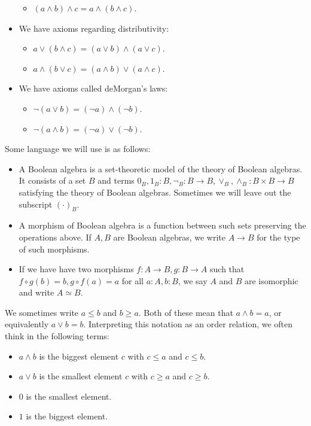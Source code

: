 \begin{definition}
\begin{itemize}
\begin{itemize}
        \item $(a \wedge b) \wedge c = a \wedge (b \wedge c)$. 
      \end{itemize}
    \item We have axioms regarding distributivity:
      \begin{itemize}
        \item $a \vee (b \wedge c) = ( a \vee b) \wedge (a \vee c)$. 
        \item $a \wedge (b \vee c) = (a \wedge b) \vee ( a\wedge c)$. 
      \end{itemize}
    \item We have axioms called deMorgan's laws:
      \begin{itemize}
        \item $\neg (a \vee b ) = (\neg a) \wedge (\neg b)$. 
        \item $\neg (a \wedge b) = (\neg a) \vee (\neg b)$. 
      \end{itemize}
  \end{itemize}
\end{definition}
\begin{definition}
  Some language we will use is as follows:
  \begin{itemize}
    \item A Boolean algebra is a set-theoretic model of the theory of Boolean algebras. 
      It consists of a set $B$ and terms $0_B,1_B: B, \neg_B : B \to B, \vee_B, \wedge_B : B \times B \to B$ 
      satisfying the theory of Boolean algebras. 
      Sometimes we will leave out the subscript $(\cdot)_B$. 
    \item A morphism of Boolean algebra is a function between such sets preserving the operations above. 
      If $A,B$ are Boolean algebras, we write $A \to B$ for the type of such morphisms. 
    \item If we have have two morphisms $f:A\to B , g : B \to A$ such that 
      $f\circ g (b) = b, g \circ f (a) = a$ for all $a:A, b:B$, 
      we say $A$ and $B$ are isomorphic and write $A \simeq B$. 
  \end{itemize}
\end{definition}
\begin{remark}
  We sometimes write $a \leq b$ and  $b \geq a$. Both of these mean that 
  $a\wedge b = a$, or equivalently $ a\vee b = b$. 
  Interpreting this notation as an order relation, we often think in the following terms:
  \begin{itemize}
    \item $a\wedge b$ is the biggest element $c$ with $c \leq a$ and $c\leq b$.
    \item $a\vee b$ is the smallest element $c$ with $c \geq a$ and $c \geq b$. 
    \item $0$ is the smallest element. 
    \item $1$ is the biggest element. 
  \end{itemize}
\end{remark}

